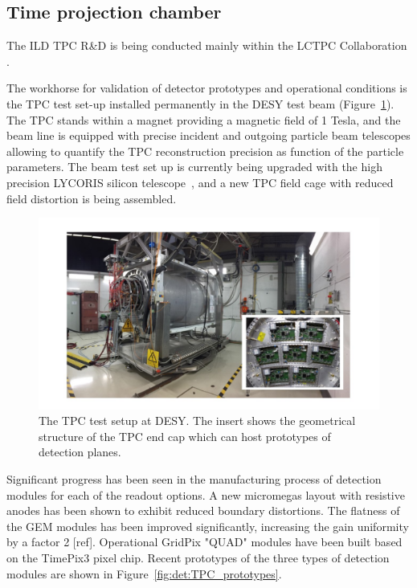 \subsection{Time projection chamber}

The ILD TPC R\&D is being conducted mainly within the LCTPC Collaboration \cite{ild:bib:TPC_lctpc}. 

The workhorse for validation of detector prototypes and operational conditions is the TPC test set-up installed permanently in the DESY test beam\cite{ild:bib:TPC_desytb} (Figure~\ref{fig:det:TPC_test_setup}). The TPC stands within a magnet providing a magnetic field of 1 Tesla, and the beam line is equipped with precise incident and outgoing particle beam telescopes allowing to quantify the TPC reconstruction precision as function of the particle parameters. The beam test set up is currently being upgraded with the high precision LYCORIS silicon telescope~\cite{ild:bib:TPC_lycoris}, and a new TPC field cage with reduced field distortion is being assembled.

\begin{figure}[t!]
\centering
\includegraphics[width=1.0\hsize]{Detector/fig/TPC_test_setup.jpg}
\caption{The TPC test setup at DESY. The insert shows the geometrical structure of the TPC end cap which can host prototypes of detection planes.}
\label{fig:det:TPC_test_setup}
\end{figure}

Significant progress has been seen in the manufacturing process of detection modules for each of the readout options. A new micromegas layout with resistive anodes has been shown to exhibit reduced boundary distortions\cite{ild:bib:TPC_distortions}. The flatness of the GEM modules has been improved significantly, increasing the gain uniformity by a factor 2 [ref]. Operational GridPix "QUAD" modules have been built based on the TimePix3 pixel chip\cite{ild:bib:TPC_quad}. Recent prototypes of the three types of detection modules are shown in Figure~\ref{fig:det:TPC_prototypes}.  

